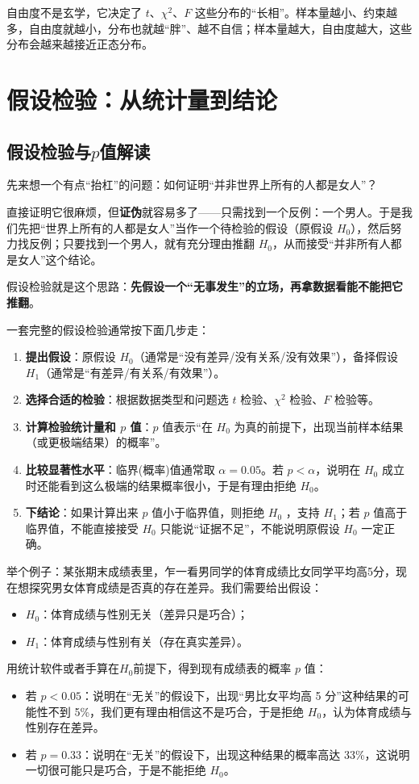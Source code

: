 \documentclass[lang=cn,10pt]{elegantbook}
\begin{document}
\begin{remark}
自由度不是玄学，它决定了 $t$、$\chi^2$、$F$ 这些分布的“长相”。样本量越小、约束越多，自由度就越小，分布也就越“胖”、越不自信；样本量越大，自由度越大，这些分布会越来越接近正态分布。
\end{remark}






\chapter{假设检验：从统计量到结论}
\section{假设检验与$p$值解读}
先来想一个有点“抬杠”的问题：如何证明“并非世界上所有的人都是女人”？

直接证明它很麻烦，但\textbf{证伪}就容易多了——只需找到一个反例：一个男人。于是我们先把“世界上所有的人都是女人”当作一个待检验的假设（原假设 $H_0$），然后努力找反例；只要找到一个男人，就有充分理由推翻 $H_0$，从而接受“并非所有人都是女人”这个结论。

假设检验就是这个思路：\textbf{先假设一个“无事发生”的立场，再拿数据看能不能把它推翻}。

一套完整的假设检验通常按下面几步走：
\begin{enumerate}
  \item \textbf{提出假设}：原假设 $H_0$（通常是“没有差异/没有关系/没有效果”），备择假设 $H_1$（通常是“有差异/有关系/有效果”）。
  \item \textbf{选择合适的检验}：根据数据类型和问题选 $t$ 检验、$\chi^2$ 检验、$F$ 检验等。
  \item \textbf{计算检验统计量和 $p$ 值}：$p$ 值表示“在 $H_0$ 为真的前提下，出现当前样本结果（或更极端结果）的概率”。
  \item \textbf{比较显著性水平}：临界(概率)值通常取 $\alpha=0.05$。若 $p<\alpha$，说明在 $H_0$ 成立时还能看到这么极端的结果概率很小，于是有理由拒绝 $H_0$。
  \item \textbf{下结论}：如果计算出来 $p$ 值小于临界值，则拒绝 $H_0$ ，支持 $H_1$；若 $p$ 值高于临界值，不能直接接受 $H_0$ 只能说“证据不足”，不能说明原假设 $H_0$ 一定正确。
\end{enumerate}

举个例子：某张期末成绩表里，乍一看男同学的体育成绩比女同学平均高5分，现在想探究男女体育成绩是否真的存在差异。我们需要给出假设：
\begin{itemize}
  \item $H_0$：体育成绩与性别无关（差异只是巧合）；
  \item $H_1$：体育成绩与性别有关（存在真实差异）。
\end{itemize}
用统计软件或者手算在$H_0$前提下，得到现有成绩表的概率 $p$ 值：
\begin{itemize}
  \item 若 $p<0.05$：说明在“无关”的假设下，出现“男比女平均高 5 分”这种结果的可能性不到 5\%，我们更有理由相信这不是巧合，于是拒绝 $H_0$，认为体育成绩与性别存在差异。
  \item 若 $p=0.33$：说明在“无关”的假设下，出现这种结果的概率高达 33\%，这说明一切很可能只是巧合，于是不能拒绝 $H_0$。
\end{itemize}
\end{document}
